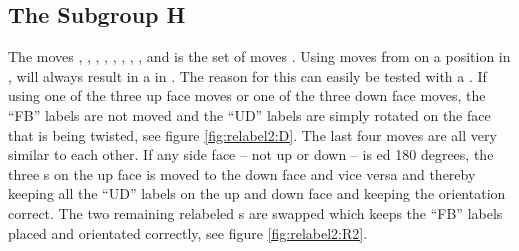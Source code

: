 \subsection{The Subgroup H}
\label{sub:theSubgroupH}
The moves , , , , , , , ,  and  is the set of moves . Using moves from  on a position in , will always result in a \rubik{} in . The reason for this can easily be tested with a \rubik{}. If using one of the three up face moves or one of the three down face moves, the ``FB'' labels are not moved and the ``UD'' labels are simply rotated on the face that is being twisted, see figure \ref{fig:relabel2:D}. The last four moves are all very similar to each other. If any side face -- not up or down -- is \twist{}ed 180 degrees, the three \facelet{}s on the up face is moved to the down face and vice versa and thereby keeping all the ``UD'' labels on the up and down face and keeping the orientation correct. The two remaining relabeled \facelet{}s are swapped which keeps the ``FB'' labels placed and orientated correctly, see figure \ref{fig:relabel2:R2}.
\vspace{-1mm}
\begin{figure}[htb]
	\centering
	\hspace{0.05\textwidth}
	\caption{}
	\label{fig:relabel2}
\end{figure}
\vspace{-1mm}
